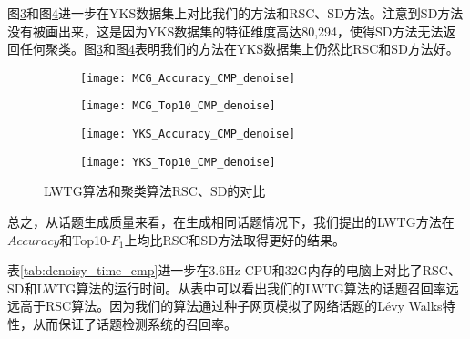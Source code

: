 图\ref{fig:YKS_Accuracy_CMP_denoise}和图\ref{fig:YKS_Top10_CMP_denoise}进一步在YKS数据集上对比我们的方法和RSC、SD方法。注意到SD方法没有被画出来，这是因为YKS数据集的特征维度高达80,294，使得SD方法无法返回任何聚类。图\ref{fig:YKS_Accuracy_CMP_denoise}和图\ref{fig:YKS_Top10_CMP_denoise}表明我们的方法在YKS数据集上仍然比RSC和SD方法好。
\begin{figure}[!htbp]
    \centering
    \begin{subfigure}[b]{0.5\textwidth}
      \texttt{[image: MCG\_Accuracy\_CMP\_denoise]}
      \caption{}
      \label{fig:MCG_Accuracy_CMP_denoise}
    \end{subfigure}%
    \begin{subfigure}[b]{0.5\textwidth}
      \texttt{[image: MCG\_Top10\_CMP\_denoise]}
      \caption{}
      \label{fig:MCG_Top10_CMP_denoise}
    \end{subfigure}
    \begin{subfigure}[b]{0.5\textwidth}
      \texttt{[image: YKS\_Accuracy\_CMP\_denoise]}
      \caption{}
      \label{fig:YKS_Accuracy_CMP_denoise}
    \end{subfigure}%
    \begin{subfigure}[b]{0.5\textwidth}
      \texttt{[image: YKS\_Top10\_CMP\_denoise]}
      \caption{}
      \label{fig:YKS_Top10_CMP_denoise}
    \end{subfigure}
    \caption{LWTG算法和聚类算法RSC、SD的对比}
    \label{fig:MCG_CMP_denoise}
\end{figure}

总之，从话题生成质量来看，在生成相同话题情况下，我们提出的LWTG方法在$Accuracy$和Top10-$F_1$上均比RSC和SD方法取得更好的结果。

表\ref{tab:denoisy_time_cmp}进一步在3.6Hz CPU和32G内存的电脑上对比了RSC、SD和LWTG算法的运行时间。从表中可以看出我们的LWTG算法的话题召回率远远高于RSC算法。因为我们的算法通过种子网页模拟了网络话题的L\'evy Walks特性，从而保证了话题检测系统的召回率。

